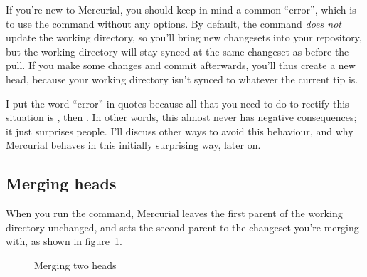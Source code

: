 \begin{note}
  If you're new to Mercurial, you should keep in mind a common
  ``error'', which is to use the  command without any
  options.  By default, the  command \emph{does not}
  update the working directory, so you'll bring new changesets into
  your repository, but the working directory will stay synced at the
  same changeset as before the pull.  If you make some changes and
  commit afterwards, you'll thus create a new head, because your
  working directory isn't synced to whatever the current tip is.

  I put the word ``error'' in quotes because all that you need to do
  to rectify this situation is , then .  In
  other words, this almost never has negative consequences; it just
  surprises people.  I'll discuss other ways to avoid this behaviour,
  and why Mercurial behaves in this initially surprising way, later
  on.
\end{note}

\subsection{Merging heads}

When you run the  command, Mercurial leaves the first
parent of the working directory unchanged, and sets the second parent
to the changeset you're merging with, as shown in
figure~\ref{fig:concepts:wdir-merge}.

\begin{figure}[ht]
  \centering
  \caption{Merging two heads}
  \label{fig:concepts:wdir-merge}
\end{figure}

